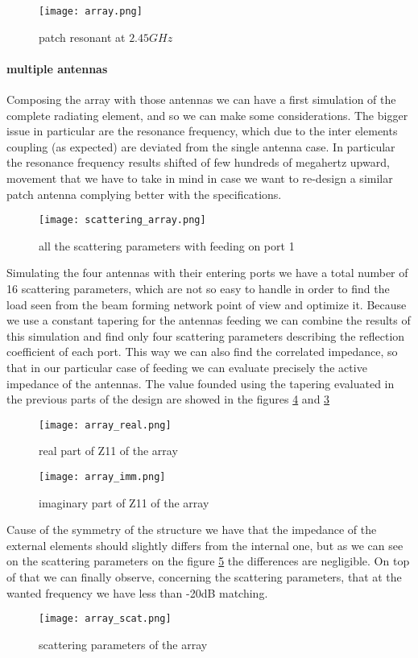 \begin{figure}[H]
	\centering
	\texttt{[image: array.png]}
	\caption{patch resonant at $2.45GHz$}
	\label{array}
\end{figure}

\paragraph{multiple antennas} Composing the array with those antennas we can have a first simulation of the complete radiating element, and so we can make some considerations. The bigger issue in particular are the resonance frequency, which due to the inter elements coupling (as expected) are deviated from the single antenna case. In particular the resonance frequency results shifted of few hundreds of megahertz upward, movement that we have to take in mind in case we want to re-design a similar patch antenna complying better with the specifications.
\begin{figure}[H]
	\centering
	\texttt{[image: scattering\_array.png]}
	\caption{all the scattering parameters with feeding on port 1}
	\label{scattering_array}
\end{figure}
Simulating the four antennas with their entering ports we have a total number of 16 scattering parameters, which are not so easy to handle in order to find the load seen from the beam forming network point of view and optimize it. Because we use a constant tapering for the antennas feeding we can combine the results of this simulation and find only four scattering parameters describing the reflection coefficient of each port. This way we can also find the correlated impedance, so that in our particular case of feeding we can evaluate precisely the active impedance of the antennas. The value founded using the tapering evaluated in the previous parts of the design are showed in the figures \ref{array_real} and \ref{array_imm}
\begin{figure}[H]
	\centering
	\texttt{[image: array\_real.png]}
	\caption{real part of Z11 of the array}
	\label{array_imm}
\end{figure}
\begin{figure}[H]
	\centering
	\texttt{[image: array\_imm.png]}
	\caption{imaginary part of Z11 of the array}
	\label{array_real}
\end{figure}
Cause of the symmetry of the structure we have that the impedance of the external elements should slightly differs from the internal one, but as we can see on the scattering parameters on the figure \ref{array_scat} the differences are negligible. On top of that we can finally observe, concerning the scattering parameters, that at the wanted frequency we have less than -20dB matching.
\begin{figure}[H]
	\centering
	\texttt{[image: array\_scat.png]}
	\caption{scattering parameters of the array}
	\label{array_scat}
\end{figure}

